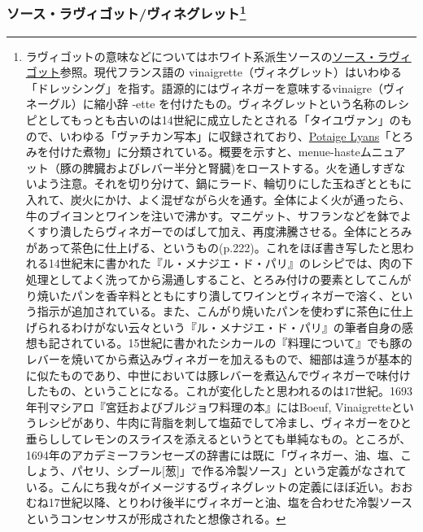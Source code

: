 \begin{recette}
{\subsubsection[ソース・ラヴィゴット/ヴィネグレット]{\texorpdfstring{ソース・ラヴィゴット/ヴィネグレット\footnote{ラヴィゴットの意味などについてはホワイト系派生ソースの\protect\hyperlink{sauce-ravigote}{ソース・ラヴィゴット}参照。現代フランス語の
  vinaigrette（ヴィネグレット）はいわゆる「ドレッシング」を指す。語源的にはヴィネガーを意味するvinaigre（ヴィネーグル）に縮小辞
  -ette
  を付けたもの。ヴィネグレットという名称のレシピとしてもっとも古いのは14世紀に成立したとされる「タイユヴァン」のもので、いわゆる「ヴァチカン写本」に収録されており、\ul{Potaige Lyans}「とろみを付けた煮物」に分類されている。概要を示すと、menue-hasteムニュアット（豚の脾臓およびレバー半分と腎臓)をローストする。火を通しすぎないよう注意。それを切り分けて、鍋にラード、輪切りにした玉ねぎとともに入れて、炭火にかけ、よく混ぜながら火を通す。全体によく火が通ったら、牛のブイヨンとワインを注いで沸かす。マニゲット、サフランなどを鉢でよくすり潰したらヴィネガーでのばして加え、再度沸騰させる。全体にとろみがあって茶色に仕上げる、というもの(p.222)。これをほぼ書き写したと思われる14世紀末に書かれた『ル・メナジエ・ド・パリ』のレシピでは、肉の下処理としてよく洗ってから湯通しすること、とろみ付けの要素としてこんがり焼いたパンを香辛料とともにすり潰してワインとヴィネガーで溶く、という指示が追加されている。また、こんがり焼いたパンを使わずに茶色に仕上げられるわけがない云々という『ル・メナジエ・ド・パリ』の筆者自身の感想も記されている。15世紀に書かれたシカールの『料理について』でも豚のレバーを焼いてから煮込みヴィネガーを加えるもので、細部は違うが基本的に似たものであり、中世においては豚レバーを煮込んでヴィネガーで味付けしたもの、ということになる。これが変化したと思われるのは17世紀。1693年刊マシアロ『宮廷およびブルジョワ料理の本』にはBoeuf,
  Vinaigretteというレシピがあり、牛肉に背脂を刺して塩茹でして冷まし、ヴィネガーをひと垂らししてレモンのスライスを添えるというとても単純なもの。ところが、1694年のアカデミーフランセーズの辞書には既に「ヴィネガー、油、塩、こしょう、パセリ、シブール{[}葱{]}」で作る冷製ソース」という定義がなされている。こんにち我々がイメージするヴィネグレットの定義にほぼ近い。おおむね17世紀以降、とりわけ後半にヴィネガーと油、塩を合わせた冷製ソースというコンセンサスが形成されたと想像される。}}{ソース・ラヴィゴット/ヴィネグレット}}\label{sauce-ravigote-froide}}




\end{recette}
